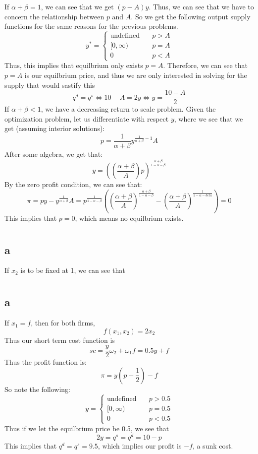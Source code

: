 \documentclass[11pt]{article}
\begin{document}
If $\alpha + \beta = 1$, we can see that we get $(p - A)y$. Thus, we can see that we have to concern the relationship between $p$ and $A$. So we get the following output supply functions for the same reasons for the previous problems. 
\[
y^* = \begin{cases}
    \text{undefined} & \quad p > A\\
    [0, \infty) & \quad p = A\\
    0 & \quad p < A
\end{cases}
\]
Thus, this implies that equilbrium only exists $p=A$. Therefore, we can see that $p =  A$ is our equilbrium price, and thus we are only interested in solving for the supply that would sastify this
\[
q^d = q^s  \iff 10 - A = 2y \iff y = \frac{10 - A}{2}
\]
If $\alpha + \beta < 1$, we have a decreasing return to scale problem. Given the optimization problem, let us differentiate with respect $y$, where we see that we get (assuming interior solutions):
\[
p = \frac{1}{\alpha + \beta} y^{\frac{1}{\alpha + \beta} - 1} A
\]
After some algebra, we get that:
\[
y = \left(\left( \frac{\alpha + \beta}{A} \right) p\right)^\frac{\alpha + \beta}{1-\alpha-\beta}
\]
By the zero profit condition, we can see that:
\[
\pi = py -y^\frac{1}{\alpha + \beta} A = p^\frac{1}{1-\alpha - \beta} \left( \left( \frac{\alpha + \beta}{A} \right)^\frac{\alpha + \beta}{1-\alpha - \beta} - \left( \frac{\alpha + \beta}{A} \right)^\frac{1}{1-\alpha-beta}\right) = 0
\]
This implies that $p =0$, which means no equilbrium exists. 
\section{}
\subsection*{a}
If $x_2$ is to be fixed at 1, we can see that 
\section{}
\subsection*{a}
If $x_1 = f$, then for both firms, 
\[
f(x_1, x_2) = 2x_2
\]
Thus our short term cost function is 
\[
sc = \frac{y}{2} \omega_2 + \omega_1 f = 0.5y + f
\]
Thus the profit function is:
\[
\pi = y(p - \frac{1}{2}) - f
\]
So note the following:
\[
y = \begin{cases}
    \text{undefined} & \quad p > 0.5\\
    [0,\infty) & \quad p = 0.5\\
    0 & \quad p < 0.5
\end{cases}
\]
Thus  if we let the equilbrium price be 0.5, we see that 
\[
2y = q^s = q^d = 10- p
\]
This implies that $q^d = q^s = 9.5$, which implies our profit is $-f$, a sunk cost. 
\end{document}
